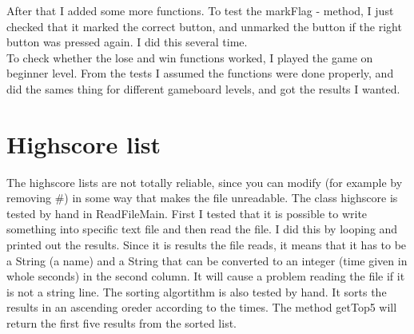 \documentclass[12pt,twoside,a4paper]{article}
\begin{document}
After that I added some more functions. To test the markFlag - method, I just checked that it marked the correct button, and unmarked the button if the right button was pressed again. I did this several time. \\

To check whether the lose and win functions worked, I played the game on beginner level. From the tests I assumed the functions were done properly, and did the sames thing for different gameboard levels, and got the results I wanted.

\section*{Highscore list}

The highscore lists are not totally reliable, since you can modify (for example by removing \#) in some way that makes the file unreadable. The class highscore is tested by hand in ReadFileMain. First I tested that it is possible to write something into specific text file and then read the file. I did this by looping and printed out the results. Since it is results the file reads, it means that it has to be a String (a name) and a String that can be converted to an integer (time given in whole seconds) in the second column. It will cause a problem reading the file if it is not a string line. The sorting algortithm is also tested by hand. It sorts the results in an ascending oreder according to the times. The method getTop5 will return the first five results from the sorted list. 
\end{document}
